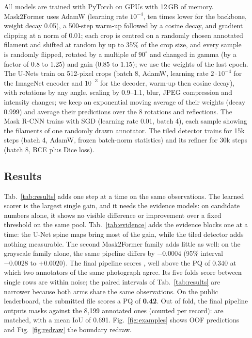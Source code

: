 \documentclass[sigconf]{acmart}
\begin{document}
All models are trained with PyTorch on GPUs with 12\,GB of memory. Mask2Former uses AdamW (learning rate $10^{-4}$, ten times lower for the backbone, weight decay 0.05), a 500-step warm-up followed by a cosine decay, and gradient clipping at a norm of 0.01; each crop is centred on a randomly chosen annotated filament and shifted at random by up to 35\% of the crop size, and every sample is randomly flipped, rotated by a multiple of $90^\circ$ and changed in gamma (by a factor of 0.8 to 1.25) and gain (0.85 to 1.15); we use the weights of the last epoch. The U-Nets train on 512-pixel crops (batch 8, AdamW, learning rate $2\cdot10^{-4}$ for the ImageNet encoder and $10^{-3}$ for the decoder, warm-up then cosine decay), with rotations by any angle, scaling by 0.9--1.1, blur, JPEG compression and intensity changes; we keep an exponential moving average of their weights (decay 0.999) and average their predictions over the 8 rotations and reflections. The Mask R-CNN trains with SGD (learning rate 0.01, batch 4), each sample showing the filaments of one randomly drawn annotator. The tiled detector trains for 15k steps (batch 4, AdamW, frozen batch-norm statistics) and its refiner for 30k steps (batch 8, BCE plus Dice loss).

\subsection{Results}
Tab.~\ref{tab:results} adds one step at a time on the same observations. The learned scorer is the largest single gain, and it needs the evidence models: on candidate numbers alone, it shows no visible difference or improvement over a fixed threshold on the same pool. Tab.~\ref{tab:evidence} adds the evidence blocks one at a time: the U-Net spine maps bring most of the gain, while the tiled detector adds nothing measurable. The second Mask2Former family adds little as well: on the grayscale family alone, the same pipeline differs by $-0.0004$ (95\% interval $-0.0028$ to $+0.0020$). The final pipeline scores , well above the PQ of 0.340 at which two annotators of the same photograph agree. Its five folds score  between single rows are within noise; the paired intervals of Tab.~\ref{tab:results} are narrower because both arms share the same observations. On the public leaderboard, the submitted file scores a PQ of \textbf{0.42}. Out of fold, the final pipeline outputs  masks against the 8,199 annotated ones (counted per record):  are matched, with a mean IoU of 0.691. Fig.~\ref{fig:examples} shows OOF predictions and Fig.~\ref{fig:redraw} the boundary redraw.
\end{document}

